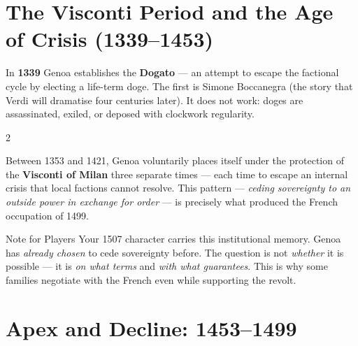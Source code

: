 \section{The Visconti Period and the Age of Crisis (1339--1453)}
\label{sec:crisis}


In \textbf{1339} Genoa establishes the \textbf{Dogato} --- an attempt to
escape the factional cycle by electing a life-term doge. The first is
Simone Boccanegra (the story that Verdi will dramatise four centuries later).
It does not work: doges are assassinated, exiled, or deposed with clockwork
regularity.

\begin{multicols}{2}

Between 1353 and 1421, Genoa voluntarily places itself under the protection
of the \textbf{Visconti of Milan} three separate times --- each time to
escape an internal crisis that local factions cannot resolve. This pattern
--- \textit{ceding sovereignty to an outside power in exchange for order}
--- is precisely what produced the French occupation of 1499.

\columnbreak

\begin{rulebox}[SharedBrown]{Note for Players}
Your 1507 character carries this institutional memory. Genoa has
\textit{already chosen} to cede sovereignty before. The question
is not \textit{whether} it is possible --- it is \textit{on what terms}
and \textit{with what guarantees}. This is why some families negotiate
with the French even while supporting the revolt.
\end{rulebox}

\end{multicols}

\section{Apex and Decline: 1453--1499}
\label{sec:decline}



